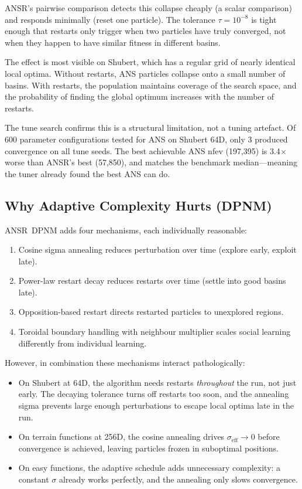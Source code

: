 \documentclass[11pt,a4paper]{article}
\begin{document}
ANSR's pairwise comparison detects this collapse cheaply (a scalar comparison) and responds minimally (reset one particle). The tolerance $\tau = 10^{-8}$ is tight enough that restarts only trigger when two particles have truly converged, not when they happen to have similar fitness in different basins.

The effect is most visible on Shubert, which has a regular grid of nearly identical local optima. Without restarts, ANS particles collapse onto a small number of basins. With restarts, the population maintains coverage of the search space, and the probability of finding the global optimum increases with the number of restarts.

The tune search confirms this is a structural limitation, not a tuning artefact. Of 600 parameter configurations tested for ANS on Shubert 64D, only 3 produced convergence on all tune seeds. The best achievable ANS nfev (197{,}395) is 3.4$\times$ worse than ANSR's best (57{,}850), and matches the benchmark median---meaning the tuner already found the best ANS can do.

\subsection{Why Adaptive Complexity Hurts (DPNM)}

ANSR~DPNM adds four mechanisms, each individually reasonable:
\begin{enumerate}
    \item Cosine sigma annealing reduces perturbation over time (explore early, exploit late).
    \item Power-law restart decay reduces restarts over time (settle into good basins late).
    \item Opposition-based restart directs restarted particles to unexplored regions.
    \item Toroidal boundary handling with neighbour multiplier scales social learning differently from individual learning.
\end{enumerate}

However, in combination these mechanisms interact pathologically:
\begin{itemize}
    \item On Shubert at 64D, the algorithm needs restarts \emph{throughout} the run, not just early. The decaying tolerance turns off restarts too soon, and the annealing sigma prevents large enough perturbations to escape local optima late in the run.
    \item On terrain functions at 256D, the cosine annealing drives $\sigma_{\text{eff}} \to 0$ before convergence is achieved, leaving particles frozen in suboptimal positions.
    \item On easy functions, the adaptive schedule adds unnecessary complexity: a constant $\sigma$ already works perfectly, and the annealing only slows convergence.
\end{itemize}
\end{document}
